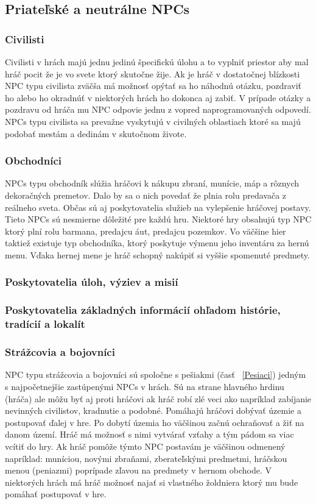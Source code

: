 \documentclass[10pt,twoside,slovak,a4paper]{article}
\begin{document}
\subsection{Priateľské a neutrálne NPCs}  \label{Ally & non}  

\subsubsection{Civilisti} 
Civilisti v hrách majú jednu jedinú špecifickú úlohu a to vyplniť priestor aby mal hráč pocit že je vo svete ktorý skutočne žije. Ak je hráč v dostatočnej blízkosti NPC typu civilista zväčša má možnosť opýtať sa ho náhodnú otázku, pozdraviť ho alebo ho okradnúť v niektorých hrách ho dokonca aj zabiť. V prípade otázky a pozdravu od hráča mu NPC odpovie jednu z vopred naprogramovaných odpovedí. NPCs typu civilista sa prevažne vyskytujú v civilných oblastiach ktoré sa majú podobať mestám a dedinám v skutočnom živote.  


\subsubsection{Obchodníci}
NPCs typu obchodník slúžia hráčovi k nákupu zbraní, munície, máp a rôznych dekoračných premetov. Dalo by sa o nich povedať že plnia rolu predavača z reálneho sveta. Občas sú aj poskytovatelia služieb na vylepšenie hráčovej postavy. Tieto NPCs sú nesmierne dôležité pre každú hru. Niektoré hry obsahujú typ NPC ktorý plní rolu barmana, predajcu áut, predajcu pozemkov. Vo väčšine hier taktiež existuje typ obchodníka, ktorý poskytuje výmenu jeho inventáru za hernú menu. Vďaka hernej mene je hráč schopný nakúpiť si vyššie spomenuté predmety.  


\subsubsection{Poskytovatelia úloh, výziev a misií}
\subsubsection{Poskytovatelia základných informácií ohľadom histórie, tradícií a lokalít}


\subsubsection{Strážcovia a bojovníci} \label{services}
NPC typu strážcovia a bojovníci sú spoločne s pešiakmi (časť ~\ref{Pesiaci}) jedným s najpočetnejšie zastúpenými NPCs v hrách. Sú na strane hlavného hrdinu (hráča) ale môžu byť aj proti hráčovi ak hráč robí zlé veci ako napríklad zabíjanie nevinných civilistov, kradnutie a podobné. Pomáhajú hráčovi dobývať územie a postupovať ďalej v hre. Po dobytí územia ho väčšinou začnú ochraňovať a žiť na danom území. Hráč má možnosť s nimi vytvárať vzťahy a tým pádom sa viac vcítiť do hry.  Ak hráč pomôže týmto NPC postavám je väčšinou odmenený napríklad: muníciou, novými zbraňami, zberateľskými predmetmi, hráčskou menou (peniazmi) poprípade zľavou na predmety v hernom obchode. V niektorých hrách má hráč možnosť najať si vlastného žoldniera ktorý mu bude pomáhať postupovať v hre.    
\end{document}
